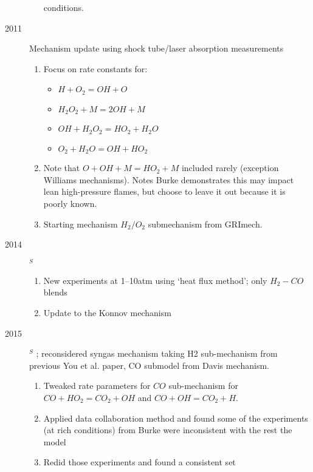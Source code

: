 \documentclass[preprint,3p,times,twocolumn]{elsarticle}
\begin{document}
\begin{description}
\begin{enumerate}
                          conditions. 
                  \end{enumerate}
                  \item[2011] \citet{HongDH11} Mechanism update using
                    shock tube/laser absorption measurements
                    \begin{enumerate}
                    \item Focus on rate constants for: 
                      \begin{itemize}
                      \item $H + O_2 = OH + O$
                      \item $H_2O_2 +M = 2OH +M$
                      \item $OH + H_2O_2 = HO_2 + H_2O$
                      \item $O_2 + H_2O = OH + HO_2$
                      \end{itemize}
                    \item Note that $O + OH + M = HO_2 + M$ included
                      rarely (exception Williams mechanisms). Notes
                      Burke demonstrates this may impact lean
                      high-pressure flames, but choose to leave it out
                      because it is poorly known. 
                      \item Starting mechanism $H_2/O_2$ submechanism
                        from GRImech.
                    \end{enumerate}
\item[2014]$^S$ \citet{GoswamiBKG14} 
  \begin{enumerate}
  \item New experiments at 1--10atm using `heat flux method'; only
    $H_2-CO$ blends
  \item Update to the Konnov mechanism
  \end{enumerate}
            \item[2015]$^S$  \citet{LiYWL15}; reconsidered syngas mechanism taking H2 sub-mechanism from previous You et al. paper, CO submodel from Davis mechanism. 
                \begin{enumerate}
                    \item Tweaked rate parameters for $CO$ sub-mechanism for $CO + HO_2 = CO_2 + OH$ and $CO+OH = CO_2 + H$. 
                    \item Applied data collaboration method and found some of the experiments (at rich conditions) from Burke were inconsistent with the rest the model
                    \item Redid those experiments and found a consistent set
                \end{enumerate}

        \end{description}
\end{document}
